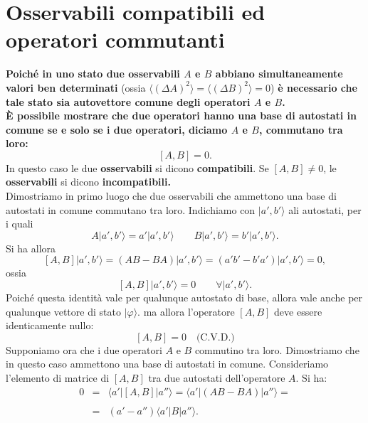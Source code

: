 \documentclass[a4paper,12pt,oneside]{book}
\begin{document}
\section{Osservabili compatibili ed operatori commutanti}
\textbf{Poiché in uno stato due osservabili $A$ e $B$ abbiano simultaneamente valori ben determinati} (ossia $\langle (\Delta A ) ^2 \rangle = \langle (\Delta B ) ^2 \rangle =0$) \textbf{è necessario che tale stato sia autovettore comune degli operatori $A$ e $B$.}\\
\textbf{È possibile mostrare che due operatori hanno una base di autostati in comune se e solo se i due operatori, diciamo $A$ e $B$, commutano tra loro:}
\begin{equation}
\left[ A, B \right] =0.
\end{equation}
In questo caso le due \textbf{osservabili} si dicono \textbf{compatibili}. Se $\left[ A, B\right] \neq 0$, le \textbf{osservabili} si dicono \textbf{incompatibili.}\\
Dimostriamo in primo luogo che due osservabili che ammettono una base di autostati in comune commutano tra loro. Indichiamo con $\vert a', b' \rangle$ ali autostati, per i quali
\begin{equation}
A\vert a', b' \rangle= a'\vert a', b' \rangle \qquad B\vert a', b' \rangle= b'\vert a', b' \rangle.
\end{equation}
Si ha allora
\begin{equation}
\left[ A, B \right]\vert a', b' \rangle = \left(AB-BA\right)\vert a', b' \rangle=\left( a'b'-b'a'\right)\vert a', b' \rangle=0,
\end{equation}
ossia
\begin{equation}
\left[A,B\right]\vert a', b' \rangle=0 \qquad \forall \vert a', b' \rangle.
\end{equation}
Poiché questa identità vale per qualunque autostato di base, allora vale anche per qualunque vettore di stato $\vert \varphi \rangle$. ma allora l'operatore $\left[ A, B \right]$ deve essere identicamente nullo:
\begin{equation}
\left[ A, B \right] =0 \quad \textrm{(C.V.D.)}
\end{equation}
Supponiamo ora che i due operatori $A$ e $B$ commutino tra loro. Dimostriamo che in questo caso ammettono una base di autostati in comune. Consideriamo l'elemento di matrice di $[A,B]$ tra due autostati dell'operatore $A$. Si ha:
\begin{eqnarray}
0& = & \langle a' \vert \left[A, B\right] \vert a'' \rangle = \langle a' \vert \left( AB-BA \right) \vert a'' \rangle = \nonumber \\
\\
& = & \left( a'-a''\right) \langle a' \vert B \vert a'' \rangle .\nonumber 
\end{eqnarray}
\end{document}

